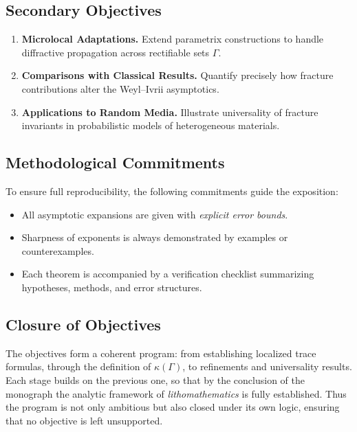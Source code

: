 \subsection*{Secondary Objectives}

\begin{enumerate}[label=\textbf{S\arabic*}]
    \item \textbf{Microlocal Adaptations.}
    Extend parametrix constructions to handle diffractive propagation across 
    rectifiable sets $\Gamma$.

    \item \textbf{Comparisons with Classical Results.}
    Quantify precisely how fracture contributions alter the Weyl–Ivrii asymptotics.

    \item \textbf{Applications to Random Media.}
    Illustrate universality of fracture invariants in probabilistic models of 
    heterogeneous materials.
\end{enumerate}

\subsection*{Methodological Commitments}

To ensure full reproducibility, the following commitments guide the exposition:

\begin{itemize}
    \item All asymptotic expansions are given with \emph{explicit error bounds}.
    \item Sharpness of exponents is always demonstrated by examples or counterexamples.
    \item Each theorem is accompanied by a verification checklist summarizing 
    hypotheses, methods, and error structures.
\end{itemize}

\subsection*{Closure of Objectives}

The objectives form a coherent program: 
from establishing localized trace formulas, through the definition of $\kappa(\Gamma)$, 
to refinements and universality results. Each stage builds on the previous one, 
so that by the conclusion of the monograph the analytic framework of 
\emph{lithomathematics} is fully established. 
Thus the program is not only ambitious but also closed under its own logic, 
ensuring that no objective is left unsupported.

